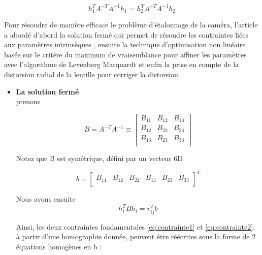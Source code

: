  \begin{equation} 
 h_{1}^{T} 
 A^{-T}
 A^{-1}
 h_1
 =
 h_{2}^{T} 
 A^{-T}
 A^{-1}
 h_2
 \label{eq:contrainte2}
 \end{equation}
 
 Pour résoudre de manière efficace le problème d'étalonnage de la caméra, l'article a abordé d'abord la solution fermé qui permet de résoudre les contraintes liées aux paramètres intrinsèques , ensuite la technique d'optimisation non linéaire basée sur le critère du maximum de vraisemblance pour affiner les paramètres avec l'algorithme de Levenberg ­Marquardt et enfin la prise en compte de la distorsion radial de la lentille pour corriger la distorsion. \\
 
 \begin{itemize}[label={\Huge$\star$}]
 	\item \textbf{La solution fermé}
 	\\
 	
 	prenons 
 	
 	\begin{equation}
 	B
 	=
 	A^{-T}
 	A^{-1}
 	\equiv
 	\left[ 
 	\begin{array}{ccc}
 		B_{11} & B_{12} & B_{13} \\
 		B_{12} & B_{22} & B_{23}\\
 	    B_{13} & B_{23} & B_{33} \\
 	\end{array} \right]
 	\label{eq:solution fermé1}
 	\end{equation}
 	
 Notez que B est symétrique, défini par un vecteur 6D
 
\begin{equation}
 b
 =
 \left[ 
 \begin{array}{cccccc}
B_{11} & B_{12}  & B_{22} & B_{13} & B_{23} & B_{33}\\
 \end{array} \right]^{T}
\label{eq:solution fermé 2}
\end{equation}
 	
 Nous avons ensuite
 \begin{equation}
  h_{i}^{T}Bh_{i}
  =
  v_{ij}^{T}b
  \label{eq:solution fermé 3}
\end{equation}
  
  Ainsi, les deux contraintes fondamentales \ref{eq:contrainte1} et \ref{eq:contrainte2}, à partir d'une 
  homographie donnée, peuvent être réécrites sous la forme de 2 équations homogènes en b :	
  

\end{itemize}
